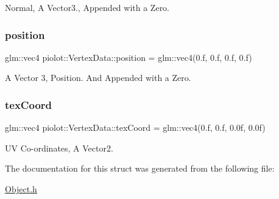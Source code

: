 Normal, A Vector3., Appended with a Zero. 

\mbox{\label{structpiolot_1_1_vertex_data_aa2301ef8c411743410ea63808f5da434}} 
\subsubsection{\texorpdfstring{position}{position}}
{\footnotesize\ttfamily glm\+::vec4 piolot\+::\+Vertex\+Data\+::position = glm\+::vec4(0.f, 0.f, 0.f, 0.f)}



A Vector 3, Position. And Appended with a Zero. 

\mbox{\label{structpiolot_1_1_vertex_data_ab3cf53f6a2dac9617bd2f39df13af149}} 
\subsubsection{\texorpdfstring{tex\+Coord}{texCoord}}
{\footnotesize\ttfamily glm\+::vec4 piolot\+::\+Vertex\+Data\+::tex\+Coord = glm\+::vec4(0.f, 0.f, 0.\+0f, 0.\+0f)}



UV Co-\/ordinates, A Vector2. 



The documentation for this struct was generated from the following file\+:\begin{DoxyCompactItemize}
\item 
\mbox{\hyperlink{_object_8h}{Object.\+h}}\end{DoxyCompactItemize}

